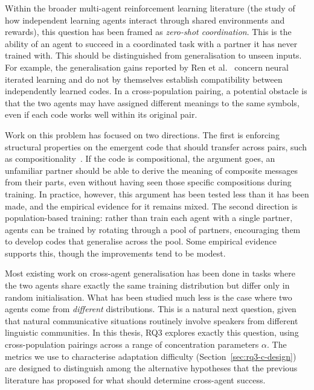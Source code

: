 Within the broader multi-agent reinforcement learning literature (the study of how independent learning agents interact through shared environments and rewards), this question has been framed as \textit{zero-shot coordination}. This is the ability of an agent to succeed in a coordinated task with a partner it has never trained with. This should be distinguished from generalisation to unseen inputs. For example, the generalisation gains reported by Ren et al.~\cite{ren_compositional_2020} concern neural iterated learning and do not by themselves establish compatibility between independently learned codes. In a cross-population pairing, a potential obstacle is that the two agents may have assigned different meanings to the same symbols, even if each code works well within its original pair.

Work on this problem has focused on two directions. The first is enforcing structural properties on the emergent code that should transfer across pairs, such as compositionality~\cite{chaabouni_compositionality_2020,ren_compositional_2020}. If the code is compositional, the argument goes, an unfamiliar partner should be able to derive the meaning of composite messages from their parts, even without having seen those specific compositions during training. In practice, however, this argument has been tested less than it has been made, and the empirical evidence for it remains mixed. The second direction is population-based training: rather than train each agent with a single partner, agents can be trained by rotating through a pool of partners, encouraging them to develop codes that generalise across the pool. Some empirical evidence supports this, though the improvements tend to be modest.

Most existing work on cross-agent generalisation has been done in tasks where the two agents share exactly the same training distribution but differ only in random initialisation. What has been studied much less is the case where two agents come from \textit{different} distributions. This is a natural next question, given that natural communicative situations routinely involve speakers from different linguistic communities. In this thesis, RQ3 explores exactly this question, using cross-population pairings across a range of concentration parameters $\alpha$. The metrics we use to characterise adaptation difficulty (Section~\ref{sec:rq3-c-design}) are designed to distinguish among the alternative hypotheses that the previous literature has proposed for what should determine cross-agent success.

